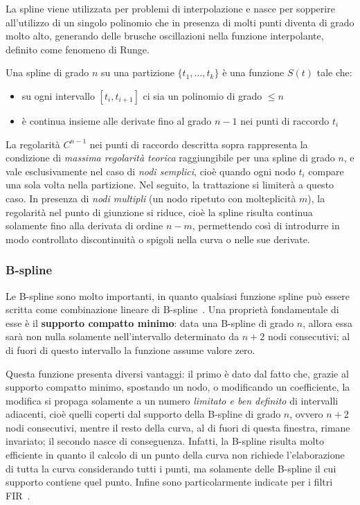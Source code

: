 La spline viene utilizzata per problemi di interpolazione e nasce per sopperire all'utilizzo di un singolo polinomio che in presenza di molti punti diventa di grado molto alto, generando delle brusche oscillazioni nella funzione interpolante, definito come fenomeno di Runge.

Una spline di grado $n$ su una partizione $\{t_1,\dots,t_k\}$ è una funzione $S(t)$ tale che:
\begin{itemize}
	\item su ogni intervallo $[t_i,t_{i+1}]$ ci sia un polinomio di grado $\le n$
	\item è continua insieme alle derivate fino al grado $n-1$ nei punti di raccordo $t_i$
\end{itemize}
La regolarità $C^{n-1}$ nei punti di raccordo descritta sopra rappresenta la condizione di \emph{massima regolarità teorica} raggiungibile per una spline di grado $n$, e vale esclusivamente nel caso di \emph{nodi semplici}, cioè quando ogni nodo $t_i$ compare una sola volta nella partizione. Nel seguito, la trattazione si limiterà a questo caso. In presenza di \emph{nodi multipli} (un nodo ripetuto con molteplicità $m$), la regolarità nel punto di giunzione si riduce, cioè la spline risulta continua solamente fino alla derivata di ordine $n-m$, permettendo così di introdurre in modo controllato discontinuità o spigoli nella curva o nelle sue derivate.

\subsubsection{B-spline}

Le B-spline sono molto importanti, in quanto qualsiasi funzione spline può essere scritta come combinazione lineare di B-spline~\cite{unser1999splines}. Una proprietà fondamentale di esse è il \textbf{supporto compatto minimo}: data una B-spline di grado $n$, allora essa sarà non nulla solamente nell'intervallo determinato da $n+2$ nodi consecutivi; al di fuori di questo intervallo la funzione assume valore zero.

Questa funzione presenta diversi vantaggi: il primo è dato dal fatto che, grazie al supporto compatto minimo, spostando un nodo, o modificando un coefficiente, la modifica si propaga solamente a un numero \emph{limitato e ben definito} di intervalli adiacenti, cioè quelli coperti dal supporto della B-spline di grado $n$, ovvero $n+2$ nodi consecutivi, mentre il resto della curva, al di fuori di questa finestra, rimane invariato; il secondo nasce di conseguenza. Infatti, la B-spline risulta molto efficiente in quanto il calcolo di un punto della curva non richiede l'elaborazione di tutta la curva considerando tutti i punti, ma solamente delle B-spline il cui supporto contiene quel punto. Infine sono particolarmente indicate per i filtri FIR~\cite{unser1999splines}.

